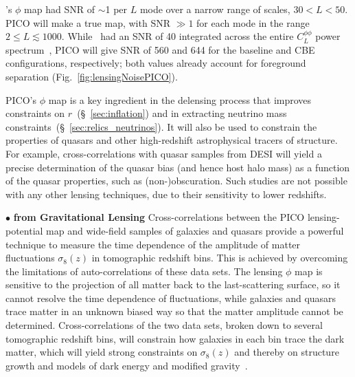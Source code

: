 \documentclass[PICOReport.tex]{subfiles}
\begin{document}
\planck 's $\phi$ map had \ac{SNR} of $\sim$1 per $L$ mode over a narrow range of scales, $30 < L < 50$. PICO will make a true map, with \ac{SNR} $\gg1$ for each mode in the range $2 \leq L \lesssim 1000$.  While \planck\ had an \ac{SNR} of 40 integrated across the entire $C_{L}^{\phi \phi}$ power spectrum~\citep{2018arXiv180706210P}, PICO will give \ac{SNR} of 560 and 644 for the baseline and CBE configurations, respectively; both values already account for foreground separation (Fig.~\ref{fig:lensingNoisePICO}). 

PICO's $\phi$ map is a key ingredient in the delensing process that improves constraints on $r$~(\S~\ref{sec:inflation}) and in extracting neutrino mass constraints~(\S~\ref{sec:relics_neutrinos}). It will also be used to constrain the properties of quasars and other high-redshift astrophysical tracers of structure.  For example, cross-correlations with quasar samples from DESI will yield a precise determination of the quasar bias (and hence host halo mass) as a function of the quasar properties, such as (non-)obscuration.  Such studies are not possible with any other lensing techniques, due to their sensitivity to lower redshifts.


\noindent$\bullet$ {\bf {} from Gravitational Lensing} \hspace{0.1in} \label{sigma8_lensing}
Cross-correlations between the PICO lensing-potential map and wide-field samples of galaxies and quasars provide a powerful technique to measure the time dependence of the amplitude of matter fluctuations $\sigma_{8}(z)$ in tomographic redshift bins. This is achieved by overcoming the limitations of auto-correlations of these data sets.
The lensing $\phi$ map is sensitive to the projection of all matter back to the last-scattering surface, so it cannot resolve the time dependence of fluctuations, while galaxies and quasars trace matter in an unknown biased way so that the matter amplitude cannot be determined.
Cross-correlations of the two data sets, broken down to several tomographic redshift bins, will constrain how galaxies in each bin trace the dark matter, which will yield strong constraints on $\sigma_8(z)$ and thereby on structure growth and models of dark energy and modified gravity~\citep{2009PhRvL.102b1302S,2018PhRvD..97l3540S}.
\end{document}
